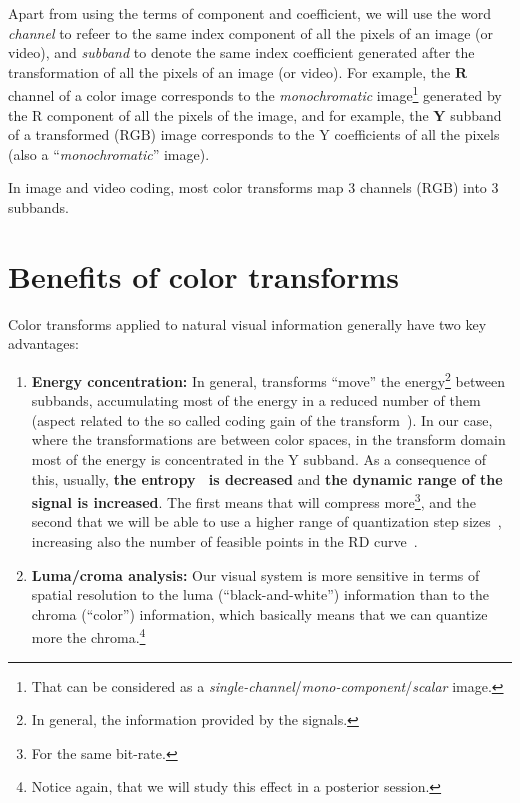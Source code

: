 Apart from using the terms of component and coefficient, we will use
the word \emph{channel} to refeer to the same index component of all
the pixels of an image (or video), and \emph{subband} to denote the
same index coefficient generated after the transformation of all the
pixels of an image (or video). For example, the $\mathbf{R}$ channel of
a color image corresponds to the \emph{monochromatic}
image\footnote{That can be considered as a
  \emph{single-channel}/\emph{mono-component}/\emph{scalar} image.}
generated by the $\text{R}$ component of all the pixels of the image,
and for example, the $\mathbf{Y}$ subband of a transformed
($\text{RGB}$) image corresponds to the $\text{Y}$ coefficients of all
the pixels (also a ``\emph{monochromatic}'' image).

In image and video coding, most color transforms map 3 channels
($\text{RGB}$) into 3 subbands.

\section{Benefits of color transforms}

Color transforms applied to natural visual information generally have
two key advantages:
\begin{enumerate}
\item \textbf{Energy concentration:} In general, transforms ``move''
  the energy\footnote{In general, the information provided by the
    signals.} between subbands, accumulating most of the energy in a
  reduced number of them (aspect related to the so called coding gain
  of the transform~\cite{vruiz__transform_coding}). In our case, where
  the transformations are between color spaces, in the transform
  domain most of the energy is concentrated in the $\text{Y}$
  subband. As a consequence of this, usually, \textbf{the
    entropy~\cite{vruiz__information_theory} is decreased} and
  \textbf{the dynamic range of the signal is increased}. The first
  means that will compress more\footnote{For the same bit-rate.}, and
  the second that we will be able to use a higher range of
  quantization step
  sizes~\cite{vruiz__scalar_quantization,sayood2017introduction},
  increasing also the number of feasible points in the RD
  curve~\cite{vruiz__information_theory}.
\item \textbf{Luma/croma analysis:} Our visual system is more
  sensitive in terms of spatial resolution to the luma
  (``black-and-white'') information than to the chroma (``color'')
  information, which basically means that we can quantize more the
  chroma.\footnote{Notice again, that we will study this effect in a
  posterior session.}
\end{enumerate}

